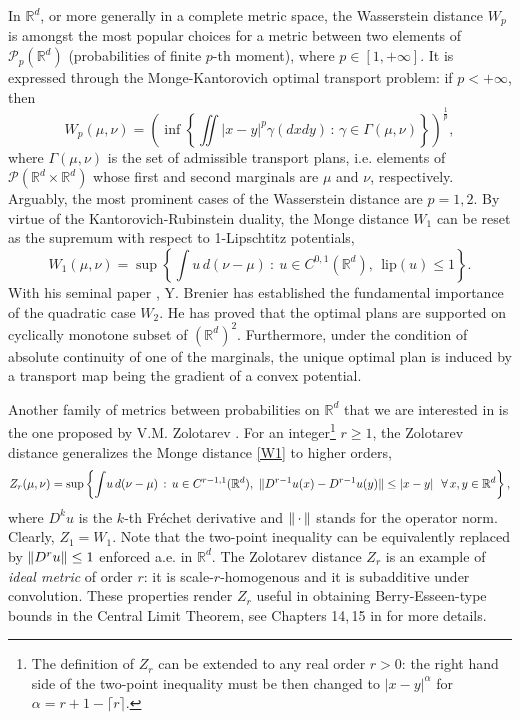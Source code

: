 \documentclass[11pt,reqno]{amsart}
\theoremstyle{definition}
\numberwithin{equation}{section}
\newcommand{\R}{\mathbb{R}}
\newcommand{\Rd}{{\R^d}}
\newcommand{\argu}{{\,\cdot\,}}
\newcommand{\PP}{\mathcal{P}}
\newcommand{\norm}[1]{\Arrowvert #1 \Arrowvert}
\newcommand{\abs}[1]{{\left \lvert #1 \right \rvert}}
\newcommand{\Lip}{{\mathrm{lip}}}
\begin{document}


In $\Rd$, or more generally in a complete metric space, the Wasserstein distance $W_p$ is amongst the most popular choices for a metric between two elements of $\PP_p(\Rd)$ (probabilities of finite $p$-th moment), where $p\in [1,+\infty]$.
It is expressed through the Monge-Kantorovich optimal transport problem: if $p< +\infty$, then
\begin{equation*}
	W_p(\mu,\nu) = \left( \inf\left\{ \iint \abs{x-y}^p \gamma(dxdy) \, : \, 	\gamma \in \Gamma(\mu,\nu)   \right\} \right)^{\frac{1}{p}},
\end{equation*}
where $\Gamma(\mu,\nu)$ is the set of admissible transport plans, i.e. elements of $\PP(\Rd \times \Rd)$ whose first and second marginals are $\mu$ and $\nu$, respectively.  Arguably, the most prominent cases of the Wasserstein distance are $p = 1,2$. By virtue of the Kantorovich-Rubinstein duality, the Monge distance $W_1$ can be reset as the supremum with respect to 1-Lipschtitz potentials,
\begin{equation}
	\label{W1}
	W_1(\mu,\nu) = \sup \left\{ \int u \, d(\nu-\mu) \ : \ u \in C^{0,1}(\Rd), \ \ \Lip(u) \le 1 \right\} .
\end{equation}
With his seminal paper  \cite{brenier1991}, Y. Brenier has established the fundamental importance of the quadratic case $W_2$. He  has proved that the optimal plans are supported on  cyclically monotone subset of $(\Rd)^2$. Furthermore, under the condition of absolute continuity of one of the marginals, the unique optimal plan is induced by a transport map being the gradient of a convex potential.

Another family of metrics between probabilities on $\Rd$ that we  are interested in is the one proposed by V.M. Zolotarev \cite{zolotarev1978}. For an integer\footnote{The definition of $Z_r$ can be extended to any real order $r >0$: the right hand side of the two-point inequality must be then changed to $\abs{x-y}^\alpha$ for $\alpha = r+1 - \lceil r \rceil$.} $r \geq 1$, the Zolotarev distance generalizes the Monge distance \eqref{W1} to higher orders,
\begin{equation*}
	Z_r(\mu,\nu) = \sup\left\{ \int \! u \, d(\nu-\mu) \, : \, u \in C^{r-1,1}(\Rd), \   \norm{D^{r-1}u(x) - D^{r-1}u(y)}  \leq \abs{x-y} \ \ \forall\, x,y \in \Rd \right\},
\end{equation*}
where $D^k u$ is the $k$-th Fréchet derivative and $\norm{\argu}$ stands for the operator norm.
Clearly, $Z_1 = W_1$. Note that the two-point inequality can be equivalently replaced by $\norm{D^r u} \leq 1$ enforced a.e. in $\Rd$. The Zolotarev distance $Z_r$ is an example of \textit{ideal metric} of order $r$: it is scale-$r$-homogenous and it is subadditive under convolution. These properties render $Z_r$ useful in obtaining Berry-Esseen-type  bounds \cite{esseen1958} in the Central Limit Theorem, see Chapters 14,\,15 in \cite{rachev1991} for more details.
\end{document}
